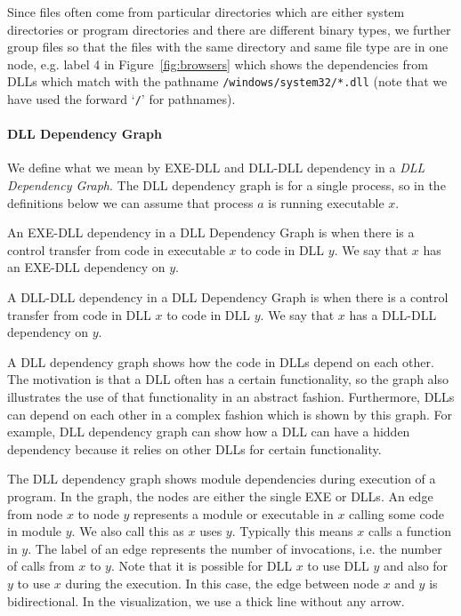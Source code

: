 Since files often come from particular directories which are either system
directories or program directories and there are different binary types,
we further group files so that the files with the same directory and
same file type are in one node, e.g. label 4 in Figure~\ref{fig:browsers}
which shows the dependencies from DLLs which match with the
pathname {\tt /windows/system32/*.dll} (note that we have used
the forward `{\tt /}' for pathnames).

\paragraph{DLL Dependency Graph}

We define what we mean by EXE-DLL and DLL-DLL dependency in
a {\em DLL Dependency Graph}. The DLL dependency graph
is for a single process, so in the definitions below
we can assume that process $a$ is running executable $x$.

\begin{definition}
An EXE-DLL dependency in a DLL Dependency Graph
is when there is a control transfer from code in executable $x$
to code in DLL $y$.
We say that $x$ has an EXE-DLL dependency on $y$.
\end{definition}

\begin{definition}
A DLL-DLL dependency in a DLL Dependency Graph
is when there is a control transfer from code in
DLL $x$ to code in DLL $y$.
We say that $x$ has a DLL-DLL dependency on $y$.
\end{definition}

A DLL dependency graph shows how the code in DLLs depend
on each other. The motivation is that a DLL often has a certain functionality,
so the graph also illustrates the use of that functionality in an
abstract fashion. Furthermore, DLLs can depend on each other in a complex
fashion which is shown by this graph.
For example, DLL dependency graph can show how a DLL can have
a hidden dependency because it relies on other DLLs for certain functionality.

The DLL dependency graph shows module dependencies during execution
of a program.
In the graph, the nodes are either the single EXE or DLLs.
An edge from node $x$ to node $y$ represents a module or executable
in $x$ calling some code in module $y$.
We also call this as $x$ uses $y$.
Typically this means $x$ calls a function in $y$.
The label of an edge represents the number of invocations, i.e.
the number of calls from $x$ to $y$.
Note that it is possible for DLL $x$ to use DLL $y$ and also for
$y$ to use $x$ during the execution.
In this case, the edge between node $x$ and $y$ is bidirectional.
In the visualization, we use a thick line without any arrow.

